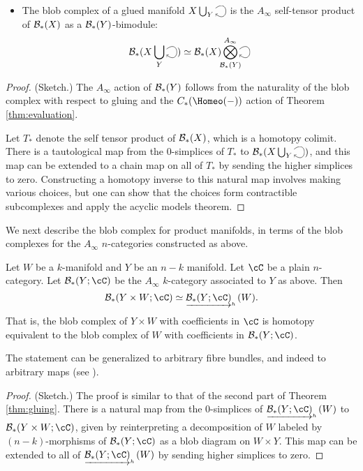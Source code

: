 \documentclass{pnastwo}
\begin{document}
\begin{article}
\begin{thm}
\begin{itemize}
\item The blob complex of a glued manifold $X\bigcup_Y \selfarrow$ is the $A_\infty$ self-tensor product of
${\mathcal B}_*(X)$ as a ${\mathcal B}_*(Y)$-bimodule:
\begin{equation*}
\bc_*(X\bigcup_Y \selfarrow) \simeq \bc_*(X) \Tensor^{A_\infty}_{\mathclap{\bc_*(Y)}} \selfarrow
\end{equation*}
\end{itemize}
\end{thm}

\begin{proof} (Sketch.)
The $A_\infty$ action of ${\mathcal B}_*(Y)$ follows from the naturality of the blob complex with respect to gluing
and the $C_*(\Homeo(-))$ action of Theorem \ref{thm:evaluation}.

Let $T_*$ denote the self tensor product of ${\mathcal B}_*(X)$, which is a homotopy colimit.
There is a tautological map from the 0-simplices of $T_*$ to $\bc_*(X\bigcup_Y \selfarrow)$,
and this map can be extended to a chain map on all of $T_*$ by sending the higher simplices to zero.
Constructing a homotopy inverse to this natural map involves making various choices, but one can show that the
choices form contractible subcomplexes and apply the acyclic models theorem.
\end{proof}

We next describe the blob complex for product manifolds, in terms of the 
blob complexes for the $A_\infty$ $n$-categories constructed as above.

\begin{thm}
\label{thm:product}
Let $W$ be a $k$-manifold and $Y$ be an $n{-}k$ manifold.
Let $\cC$ be a plain $n$-category.
Let $\bc_*(Y;\cC)$ be the $A_\infty$ $k$-category associated to $Y$ as above.
Then
\[
	\bc_*(Y\times W; \cC) \simeq \clh{\bc_*(Y;\cC)}(W).
\]
That is, the blob complex of $Y\times W$ with coefficients in $\cC$ is homotopy equivalent
to the blob complex of $W$ with coefficients in $\bc_*(Y;\cC)$.
\end{thm}
The statement can be generalized to arbitrary fibre bundles, and indeed to arbitrary maps
(see \cite[\S7.1]{1009.5025}).

\begin{proof} (Sketch.)
The proof is similar to that of the second part of Theorem \ref{thm:gluing}.
There is a natural map from the 0-simplices of $\clh{\bc_*(Y;\cC)}(W)$ to $\bc_*(Y\times W; \cC)$,
given by reinterpreting a decomposition of $W$ labeled by $(n{-}k)$-morphisms of $\bc_*(Y; \cC)$ as a blob 
diagram on $W\times Y$.
This map can be extended to all of $\clh{\bc_*(Y;\cC)}(W)$ by sending higher simplices to zero.


\end{proof}
\end{article}
\end{document}
